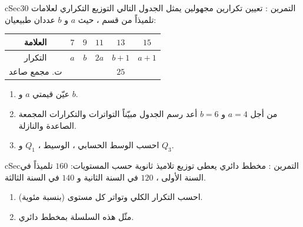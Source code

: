 \documentclass[12pt,a4paper]{article}
\newenvironment{BOX}[2]{\begin{otherlanguage}{english}\begin{arbox}{#1}{#2}}{\end{arbox}\end{otherlanguage}}
\newcounter{exo}
\newenvironment{tamrin}[1]{\stepcounter{exo}\begin{BOX}{cSec}{التمرين \theexo: #1}}{\end{BOX}}
\begin{document}
\begin{tamrin}{تعيين تكرارين مجهولين}
يمثل الجدول التالي التوزيع التكراري لعلامات $30$ تلميذاً من قسم ، حيث $a$ و $b$ عددان طبيعيان:
\begin{center}
\renewcommand{\arraystretch}{1.45}
\begin{tabular}{|c|c|c|c|c|c|}\hline
\cellcolor{cSec!12}العلامة & $7$ & $9$ & $11$ & $13$ & $15$\\\hline
\cellcolor{cSec!12}التكرار & $a$ & $b$ & $2a$ & $b+1$ & $a+1$\\\hline
\cellcolor{cSec!12}ت. مجمع صاعد & & & & $25$ & \\\hline
\end{tabular}
\end{center}
\begin{enumerate}
\item عيّن قيمتي $a$ و $b$.
\item من أجل $a=4$ و $b=6$ أعد رسم الجدول مبيّناً التواترات والتكرارات المجمعة الصاعدة والنازلة.
\item احسب الوسط الحسابي ، الوسيط ، $Q_1$ و $Q_3$.
\end{enumerate}
\end{tamrin}

\begin{tamrin}{مخطط دائري}
يعطى توزيع تلاميذ ثانوية حسب المستويات: $160$ تلميذاً في السنة الأولى ، $120$ في السنة الثانية و $140$ في السنة الثالثة.
\begin{enumerate}
\item احسب التكرار الكلي وتواتر كل مستوى (بنسبة مئوية).
\item مثّل هذه السلسلة بمخطط دائري.
\end{enumerate}
\end{tamrin}
\end{document}
